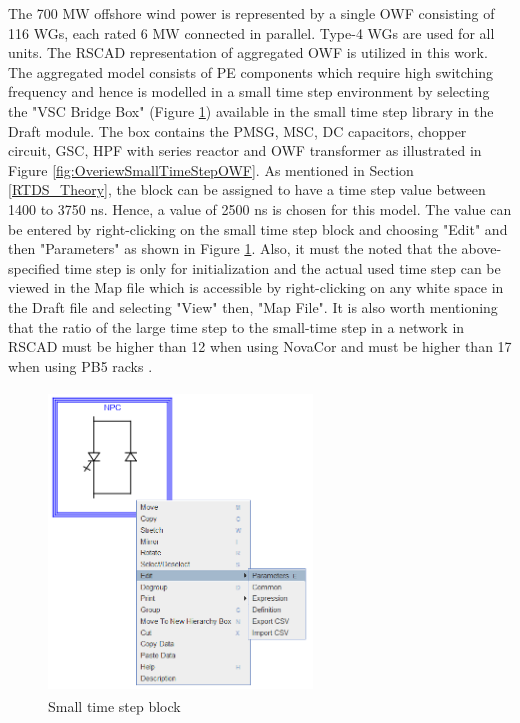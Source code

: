 The 700 MW offshore wind power is represented by a single \gls{OWF} consisting of 116 \gls{WG}s, each rated 6 MW connected in parallel. Type-4 \gls{WG}s are used for all units. The RSCAD representation of aggregated \gls{OWF} is utilized in this work. The aggregated model consists of \gls{PE} components which require high switching frequency %
and hence is modelled in a small time step environment by selecting the "VSC Bridge Box" (Figure \ref{fig:SmallTimeStepBlock}) available in the small time step library in the Draft module. The box contains the \gls{PMSG}, \gls{MSC}, \gls{DC} capacitors, chopper circuit, \gls{GSC}, \gls{HPF} with series reactor and \gls{OWF} transformer as illustrated in Figure \ref{fig:OveriewSmallTimeStepOWF}. As mentioned in Section \ref{RTDS_Theory}, the block can be assigned to have a time step value between 1400 to 3750 ns. Hence, a value of 2500 ns is chosen for this model. 
The value can be entered by right-clicking on the small time step block and choosing "Edit" and then "Parameters" as shown in Figure \ref{fig:SmallTimeStepBlock}. Also, it must the noted that the above-specified time step is only for initialization and the actual used time step can be viewed in the Map file which is accessible by right-clicking on any white space in the Draft file and selecting "View" then, "Map File". It is also worth mentioning that the ratio of the large time step to the small-time step in a network in RSCAD must be higher than 12 when using NovaCor and must be higher than 17 when using PB5 racks \cite{rtds_tech}. 

\begin{figure}[H]
\centering
    \includegraphics[height = 8cm,width = 7cm]{Diagrams/Chapter_3/SmallTimeStepBlock.PNG}
    \caption{Small time step block}
    \label{fig:SmallTimeStepBlock}
\end{figure}

